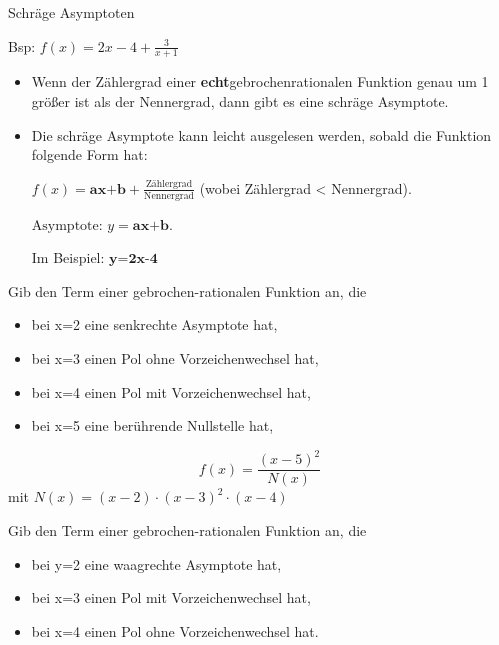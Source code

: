 \documentclass[paper=a6,landscape,ngerman,twoside=true,fontsize=12pt]{scrartcl}
\begin{document}
\begin{frage}
	Schräge Asymptoten \bigskip
	
	Bsp: $f(x)=2x -4 +\frac{3}{x+1}$
\end{frage}
\begin{antwort}
	\begin{itemize} 
		\item \large Wenn der Zählergrad einer \textbf{echt}gebrochenrationalen Funktion genau um 1 größer ist als der Nennergrad, dann gibt es eine schräge Asymptote.		
		
		\item Die schräge Asymptote kann leicht ausgelesen werden, sobald die Funktion folgende Form hat: 
		
		$f(x)=\textbf{ax+b} + \frac{\text{Zählergrad}}{\text{Nennergrad}}$ 
		(wobei Zählergrad < Nennergrad).
		
		$\text{Asymptote: } y=\textbf{ax+b}.$	
		
		Im Beispiel: $\textbf {y=2x-4}$
	\end{itemize} 
\end{antwort}
\begin{frage}
	\LARGE Gib den Term einer gebrochen-rationalen Funktion an, die
	\begin{itemize} \large
		\item bei x=2 eine senkrechte Asymptote hat,		
		\item bei x=3 einen Pol ohne Vorzeichenwechsel hat, 
		\item bei x=4 einen Pol mit Vorzeichenwechsel hat,
		\item bei x=5 eine berührende Nullstelle hat,			
	\end{itemize} 
\end{frage}
\begin{antwort}
	\LARGE 
	\[ f(x)=\frac{ (x-5)^2 }{N(x)} \]
	\normalsize mit $N(x)=(x-2) \cdot (x-3)^2 \cdot (x-4)$
\end{antwort}
\begin{frage}
	\LARGE Gib den Term einer gebrochen-rationalen Funktion an, die
	\begin{itemize} \large
		\item bei y=2 eine waagrechte Asymptote hat,		
		\item bei x=3 einen Pol mit Vorzeichenwechsel hat, 
		\item bei x=4 einen Pol ohne Vorzeichenwechsel hat.	
		
	\end{itemize} 
	
\end{frage}
\end{document}
